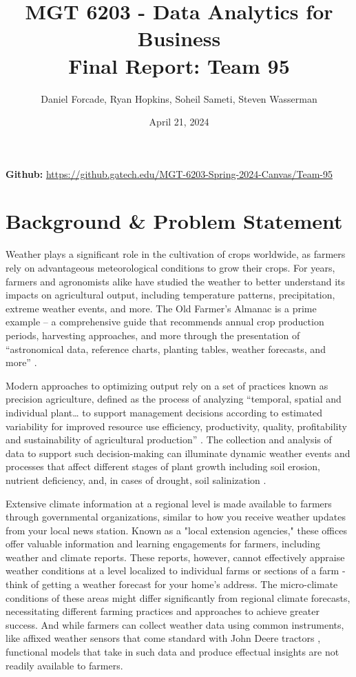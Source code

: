\documentclass{article}
\title{MGT 6203 - Data Analytics for Business\\Final Report: Team 95}
\author{Daniel Forcade, Ryan Hopkins, Soheil Sameti, Steven Wasserman\\

}
\date{April 21, 2024}
\begin{document}
\maketitle

\begin{center}
\textbf{Github: }{\url{https://github.gatech.edu/MGT-6203-Spring-2024-Canvas/Team-95 } }
\end{center}

\section{Background \& Problem  Statement}
\label{sec:background}
\hspace{.5cm} Weather plays a significant role in the cultivation of crops worldwide, as farmers rely on advantageous meteorological conditions to grow their crops. For years, farmers and agronomists alike have studied the weather to better understand its impacts on agricultural output, including temperature patterns, precipitation, extreme weather events, and more. The Old Farmer’s Almanac is a prime example – a comprehensive guide that recommends annual crop production periods, harvesting approaches, and more through the presentation of “astronomical data, reference charts, planting tables, weather forecasts, and more” \citep{FineGardening}.

Modern approaches to optimizing output rely on a set of practices known as precision agriculture, defined as the process of analyzing “temporal, spatial and individual plant… to support management decisions according to estimated variability for improved resource use efficiency, productivity, quality, profitability and sustainability of agricultural production” \citep{ISPA}. The collection and analysis of data to support such decision-making can illuminate dynamic weather events and processes that affect different stages of plant growth including soil erosion, nutrient deficiency, and, in cases of drought, soil salinization \citep{EOS}.

Extensive climate information at a regional level is made available to farmers through governmental organizations, similar to how you receive weather updates from your local news station. Known as a "local extension agencies," these offices offer valuable information and learning engagements for farmers, including weather and climate reports. These reports, however, cannot effectively appraise weather conditions at a level localized to individual farms or sections of a farm - think of getting a weather forecast for your home's address. The micro-climate conditions of these areas might differ significantly from regional climate forecasts, necessitating different farming practices and approaches to achieve greater success. And while farmers can collect weather data using common instruments, like affixed weather sensors that come standard with John Deere tractors \citep{JohnDeere}, functional models that take in such data and produce effectual insights are not readily available to farmers. 
\end{document}
